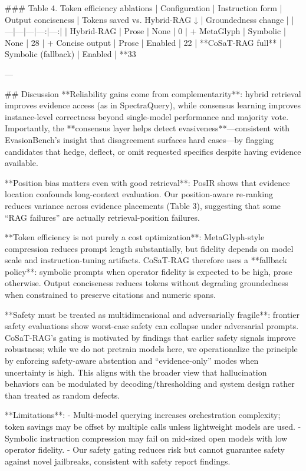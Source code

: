 ### Table 4. Token efficiency ablations  
| Configuration | Instruction form | Output conciseness | Tokens saved vs. Hybrid-RAG ↓ | Groundedness change |
|---|---|---|---:|---:|
| Hybrid-RAG | Prose | None | 0%
| + MetaGlyph | Symbolic | None | 28%
| + Concise output | Prose | Enabled | 22%
| **CoSaT-RAG full** | Symbolic (fallback) | Enabled | **33%

---

## Discussion  
**Reliability gains come from complementarity**: hybrid retrieval improves evidence access (as in SpectraQuery), while consensus learning improves instance-level correctness beyond single-model performance and majority vote. Importantly, the **consensus layer helps detect evasiveness**—consistent with EvasionBench’s insight that disagreement surfaces hard cases—by flagging candidates that hedge, deflect, or omit requested specifics despite having evidence available.

**Position bias matters even with good retrieval**: PosIR shows that evidence location confounds long-context evaluation. Our position-aware re-ranking reduces variance across evidence placements (Table 3), suggesting that some “RAG failures” are actually retrieval-position failures.

**Token efficiency is not purely a cost optimization**: MetaGlyph-style compression reduces prompt length substantially, but fidelity depends on model scale and instruction-tuning artifacts. CoSaT-RAG therefore uses a **fallback policy**: symbolic prompts when operator fidelity is expected to be high, prose otherwise. Output conciseness reduces tokens without degrading groundedness when constrained to preserve citations and numeric spans.

**Safety must be treated as multidimensional and adversarially fragile**: frontier safety evaluations show worst-case safety can collapse under adversarial prompts. CoSaT-RAG’s gating is motivated by findings that earlier safety signals improve robustness; while we do not pretrain models here, we operationalize the principle by enforcing safety-aware abstention and “evidence-only” modes when uncertainty is high. This aligns with the broader view that hallucination behaviors can be modulated by decoding/thresholding and system design rather than treated as random defects.

**Limitations**:  
- Multi-model querying increases orchestration complexity; token savings may be offset by multiple calls unless lightweight models are used.  
- Symbolic instruction compression may fail on mid-sized open models with low operator fidelity.  
- Our safety gating reduces risk but cannot guarantee safety against novel jailbreaks, consistent with safety report findings.

